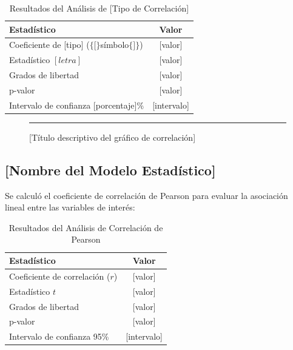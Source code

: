 \documentclass[12pt, letterpaper]{article}
\begin{document}
\begin{table}[H]
    \centering
    \caption{Resultados del Análisis de [Tipo de Correlación]}
    \begin{tabular}{@{}lc@{}}
        \toprule
        \textbf{Estadístico}                              & \textbf{Valor} \\
        \midrule
        Coeficiente de {[}tipo{]} ($\{[\}$símbolo$\{]\}$) & {[}valor{]}    \\
        Estadístico $[letra]$                             & [valor]        \\
        Grados de libertad                                & [valor]        \\
        p-valor                                           & [valor]        \\
        Intervalo de confianza [porcentaje]\%             & [intervalo]    \\
        \bottomrule
    \end{tabular}
    \label{tab:[etiqueta_correlacion]}
\end{table}

\begin{figure}[H]
    \centering
    \rule{8cm}{5cm} %
    \caption{[Título descriptivo del gráfico de correlación]}
    \label{fig:[etiqueta_correlacion]}
\end{figure}

\subsection{[Nombre del Modelo Estadístico]}

Se calculó el coeficiente de correlación de Pearson para evaluar la asociación lineal
entre las variables de interés:

\begin{table}[H]
    \centering
    \caption{Resultados del Análisis de Correlación de Pearson}
    \begin{tabular}{@{}lc@{}}
        \toprule
        \textbf{Estadístico}             & \textbf{Valor} \\
        \midrule
        Coeficiente de correlación ($r$) & [valor]        \\
        Estadístico $t$                  & [valor]        \\
        Grados de libertad               & [valor]        \\
        p-valor                          & [valor]        \\
        Intervalo de confianza 95\%      & [intervalo]    \\
        \bottomrule
    \end{tabular}
    \label{tab:correlacion}
\end{table}
\end{document}
